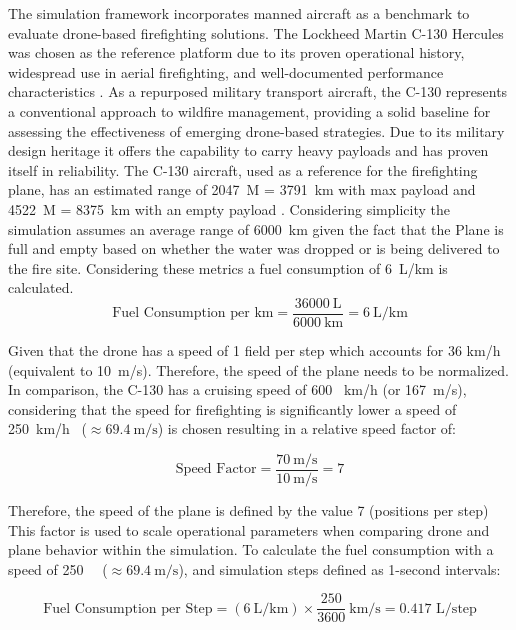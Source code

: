 \documentclass[11pt, a4paper]{article}
\begin{document}
The simulation framework incorporates manned aircraft as a benchmark to evaluate drone-based firefighting solutions. The Lockheed Martin C-130 Hercules was chosen as the reference platform due to its proven operational history, widespread use in aerial firefighting, and well-documented performance characteristics \citep{LockheedC130Hercules2022}. As a repurposed military transport aircraft, the C-130 represents a conventional approach to wildfire management, providing a solid baseline for assessing the effectiveness of emerging drone-based strategies. Due to its military design heritage it offers the capability to carry heavy payloads and has proven itself in reliability.
The C-130 aircraft, used as a reference for the firefighting plane, has an estimated range of \SI{2047}{\nauticalmile} = \SI{3791}{\kilo\meter} with max payload and \SI{4522}{\nauticalmile} = \SI{8375}{\kilo\meter} with an empty payload \citep{LockheedC130Hercules2022}. Considering simplicity the simulation assumes an average range of \SI{6000}{\kilo\meter} given the fact that the Plane is full and empty based on whether the water was dropped or is being delivered to the fire site. Considering these metrics a fuel consumption of \SI{6}{\liter}/km is calculated.
\[
\text{Fuel Consumption per km} =\frac{36000~\text{L}}{6000~\text{km}} = 6~\text{L/km}
\]

Given that the drone has a speed of 1 field per step which accounts for 36 km/h \citep{DJIAGRAST50} (equivalent to 10~m/s). Therefore, the speed of the plane needs to be normalized. In comparison, the C-130 has a cruising speed of 600 ~km/h \citep{LockheedC130Hercules2022} (or 167~m/s), considering that the speed for firefighting is significantly lower a speed of 250~km/h \ (\(\approx 69.4~\text{m/s}\)) is chosen resulting in a relative speed factor of:

\begin{equation}
\text{Speed Factor}= \frac{70~\text{m/s}}{10~\text{m/s}} = 7
\end{equation}

Therefore, the speed of the plane is defined by the value 7 (positions per step)
This factor is used to scale operational parameters when comparing drone and plane behavior within the simulation. To calculate the fuel consumption with a speed of 250~ \ (\(\approx 69.4~\text{m/s}\)), and simulation steps defined as 1-second intervals:

\[
\text{Fuel Consumption per Step}= (6~\text{L/km}) \times \frac{250}{3600}~\text{km/s} = 0.417\text{ L/step}
\]
\end{document}
